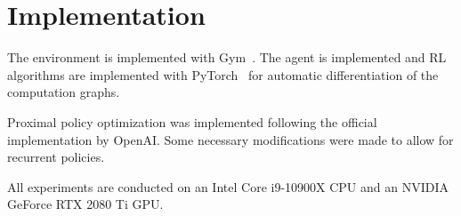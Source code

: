 
\section{Implementation}

The environment is implemented with Gym~\cite{brockman_gym_2016}. The agent is implemented and RL algorithms are implemented with PyTorch~\cite{paszke_pytorch_nodate} for automatic differentiation of the computation graphs.

Proximal policy optimization was implemented following the official implementation by OpenAI.
Some necessary modifications were made to allow for recurrent policies.

All experiments are conducted on an Intel Core i9-10900X CPU and an NVIDIA GeForce RTX 2080 Ti GPU.




















